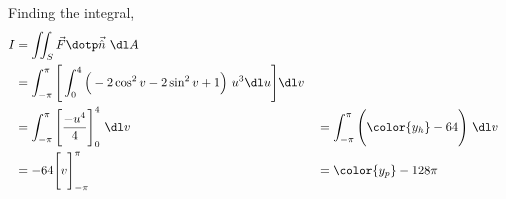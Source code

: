\begin{enumerate}
          Finding the integral,
          \begin{align}
              I       & = \iint_S \vec{F} \dotp \vec{\hat{n}}\ \dl A               \\
                      & = \int_{-\pi}^{\pi}
              \Bigg[\int_{0}^{4} \Big( -2 \cos^2 v - 2 \sin^2 v + 1 \Big)\ u^3
              \dl u \Bigg] \dl v                                                   \\
                      & = \int_{-\pi}^{\pi} \Bigg[ \frac{-u^4}{4} \Bigg]_{0}^{4}
              \ \dl v &
                      & = \int_{-\pi}^{\pi}
              \Bigg( {\color{y_h} -64} \Bigg)\ \dl v                               \\
                      & = -64\Bigg[ v \Bigg]_{-\pi}^{\pi}                        &
                      & = \color{y_p} -128\pi
          \end{align}


\end{enumerate}
